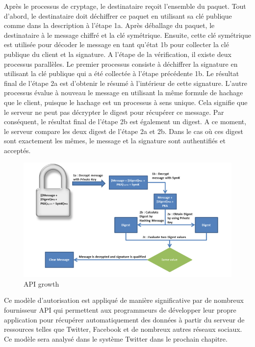 \begin{itemize}
Après le processus de cryptage, le destinataire reçoit l'ensemble du paquet. Tout d'abord, le destinataire doit déchiffrer ce paquet en utilisant sa clé publique comme dans la description à l'étape 1a. Après déballage du paquet, le destinataire à le message chiffré et la clé symétrique. Ensuite, cette clé symétrique est utilisée pour décoder le message en tant qu'état 1b pour collecter la clé publique du client et la signature.
A l'étape de la vérification, il existe deux processus parallèles. Le premier processus consiste à déchiffrer la signature en utilisant la clé publique qui a été collectée à l'étape précédente 1b. Le résultat final de l'étape 2a est d'obtenir le résumé à l'intérieur de cette signature. L'autre processus évalue à nouveau le message en utilisant la même formule de hachage que le client, puisque le hachage est un processus à sens unique. Cela signifie que le serveur ne peut pas décrypter le digest pour récupérer ce message. Par conséquent, le résultat final de l'étape 2b est également un digest. A ce moment, le serveur compare les deux digest de l'étape 2a et 2b. Dans le cas où ces digest sont exactement les mêmes, le message et la signature sont authentifiés et acceptés.
\begin{figure}[! ht ]
			\centering
			\includegraphics[scale=.4]{./images/api_decryption_detail.png}
			\caption {API growth}
		\end{figure}
Ce modèle d'autorisation est appliqué de manière significative par de nombreux fournisseur API qui permettent aux programmeurs de développer leur propre application pour récupérer automatiquement des données à partir du serveur de ressources telles que Twitter, Facebook et de nombreux autres réseaux sociaux. Ce modèle sera analysé dans le système Twitter dans le prochain chapitre.
\end{itemize}




